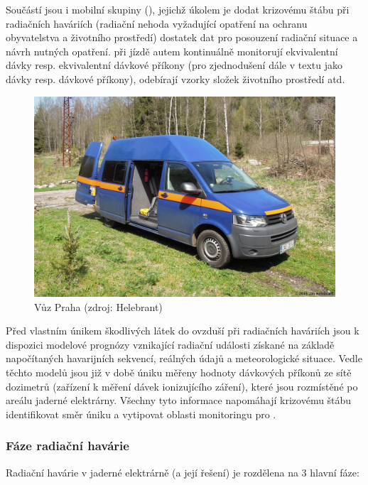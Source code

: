 Součástí  jsou i mobilní skupiny (), jejichž úkolem je dodat krizovému štábu při radiačních haváriích (radiační nehoda vyžadující opatření na ochranu obyvatelstva a životního prostředí) dostatek dat pro posouzení radiační situace a návrh nutných opatření.  při jízdě autem kontinuálně monitorují ekvivalentní dávky resp. ekvivalentní dávkové příkony (pro zjednodušení dále v textu jako dávky resp. dávkové příkony), odebírají vzorky složek životního prostředí atd.  \cite{metodika} \cite{pecha2011monitorovani}

\begin{figure}[H]
    \centering
    \includegraphics[scale=0.6]{./pictures/vuzSURO.jpg}
      	\caption[Vůz   Praha]{Vůz   Praha (zdroj: Helebrant)}
    	\label{fig:vuzSURO}
\end{figure} 

Před vlastním únikem škodlivých látek do ovzduší při radiačních haváriích jsou k dispozici modelové prognózy vznikající radiační události získané na základě napočítaných havarijních sekvencí, reálných údajů a meteorologické situace. Vedle těchto modelů jsou již v době úniku měřeny hodnoty dávkových příkonů ze sítě dozimetrů (zařízení k měření dávek ionizujícího záření), které jsou rozmístěné po areálu jaderné elektrárny. Všechny tyto informace napomáhají krizovému štábu identifikovat směr úniku a vytipovat oblasti monitoringu pro . 

\subsubsection{Fáze radiační havárie}

Radiační havárie v jaderné elektrárně (a její řešení) je rozdělena na 3 hlavní fáze:

